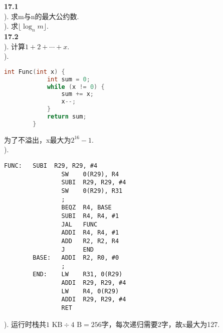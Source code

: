 ﻿\documentclass[UTF8,fontset=fandol]{ctexart}
\begin{document}
\pagestyle{main}
\noindent\textbf{17.1}\\
). 求m与n的最大公约数.\\
). 求$\lfloor\log_n m\rfloor$.\\
\noindent\textbf{17.2}\\
). 计算$1+2+\cdots+x$.\\
).
\linespread{1}
\begin{lstlisting}[language=C,numbers=none]
        int Func(int x) {
            int sum = 0;
            while (x != 0) {
                sum += x;
                x--;
            }
            return sum;
        }
\end{lstlisting}
\linespread{1.5}

为了不溢出，x最大为$2^{16}-1$.\\
).
\linespread{1}
\begin{lstlisting}[numbers=none]
        FUNC:   SUBI  R29, R29, #4
                SW    0(R29), R4
                SUBI  R29, R29, #4
                SW    0(R29), R31
                ;
                BEQZ  R4, BASE
                SUBI  R4, R4, #1
                JAL   FUNC
                ADDI  R4, R4, #1
                ADD   R2, R2, R4
                J     END
        BASE:   ADDI  R2, R0, #0
                ;
        END:    LW    R31, 0(R29)
                ADDI  R29, R29, #4
                LW    R4, 0(R29)
                ADDI  R29, R29, #4
                RET
\end{lstlisting}
\linespread{1.5}

). 运行时栈共$1\text{ KB}\div4\text{ B}=256$字，每次递归需要2字，故x最大为127.
\end{document}
